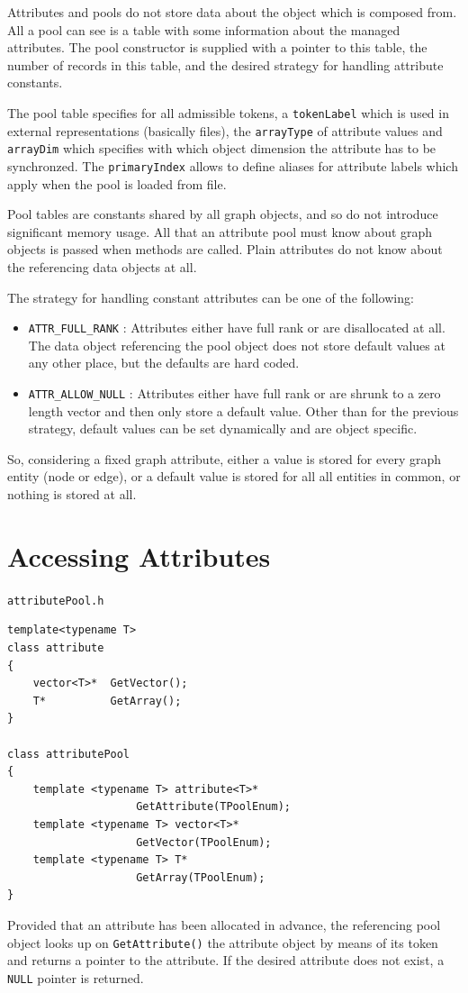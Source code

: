 \documentclass[a4paper,11pt,twoside]{book}
\begin{document}
\begin{multicols}{2}
Attributes and pools do not store data about the object which is composed from.
All a pool can see is a table with some information about the managed
attributes. The pool constructor is supplied with a pointer to this table, the
number of records in this table, and the desired strategy for handling attribute
constants.

The pool table specifies for all admissible tokens, a \verb/tokenLabel/ which is
used in external representations (basically files), the \verb/arrayType/ of
attribute values and \verb/arrayDim/ which specifies with which object dimension
the attribute has to be synchronzed. The \verb/primaryIndex/ allows to define
aliases for attribute labels which apply when the pool is loaded from file.

Pool tables are constants shared by all graph objects, and so do not
introduce significant memory usage. All that an attribute pool must know about
graph objects is passed when methods are called. Plain attributes
do not know about the referencing data objects at all.

The strategy for handling constant attributes can be one of the following:
\begin{itemize}
\item \verb/ATTR_FULL_RANK/ : Attributes either have full rank or are disallocated
    at all. The data object referencing the pool object does not store default
    values at any other place, but the defaults are hard coded.
\item \verb/ATTR_ALLOW_NULL/ : Attributes either have full rank or are shrunk to
    a zero length vector and then only store a default value. Other than for the
    previous strategy, default values can be set dynamically and are object specific.
\end{itemize}
So, considering a fixed graph attribute, either a value is stored for every graph
entity (node or edge), or a default value is stored for all all entities in common,
or nothing is stored at all.


\section{Accessing Attributes}
\myinclude\verb/attributePool.h/
\begin{mymethods}
\begin{verbatim}
template<typename T>
class attribute
{
    vector<T>*  GetVector();
    T*          GetArray();
}

class attributePool
{
    template <typename T> attribute<T>*
                    GetAttribute(TPoolEnum);
    template <typename T> vector<T>*
                    GetVector(TPoolEnum);
    template <typename T> T*
                    GetArray(TPoolEnum);
}
\end{verbatim}
\end{mymethods}
Provided that an attribute has been allocated in advance, the referencing pool
object looks up on \verb/GetAttribute()/ the attribute object by means
of its token and returns a pointer to the attribute. If the desired attribute
does not exist, a \verb/NULL/ pointer is returned.


\end{multicols}
\end{document}
